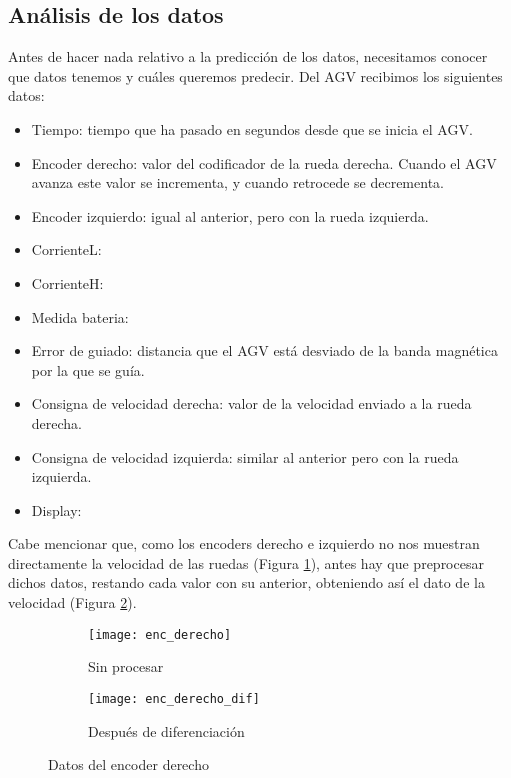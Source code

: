 \subsection{Análisis de los datos}

Antes de hacer nada relativo a la predicción de los datos, necesitamos conocer que datos tenemos y cuáles 
queremos predecir. Del AGV recibimos los siguientes datos:
\begin{itemize}
    \item Tiempo: tiempo que ha pasado en segundos desde que se inicia el AGV.
    \item Encoder derecho: valor del codificador de la rueda derecha. Cuando el AGV avanza este valor se
        incrementa, y cuando retrocede se decrementa.
    \item Encoder izquierdo: igual al anterior, pero con la rueda izquierda.
    \item CorrienteL: %
    \item CorrienteH: %
    \item Medida bateria: %
    \item Error de guiado: distancia que el AGV está desviado de la banda magnética por la que se guía.
    \item Consigna de velocidad derecha: valor de la velocidad enviado a la rueda derecha.
    \item Consigna de velocidad izquierda: similar al anterior pero con la rueda izquierda.
    \item Display: %
\end{itemize}

Cabe mencionar que, como los encoders derecho e izquierdo no nos muestran directamente la velocidad de las 
ruedas (Figura \ref{fig:datos_enc_derecho_sp}), antes hay que preprocesar dichos datos, restando cada valor con su anterior, obteniendo así el dato de la 
velocidad (Figura \ref{fig:datos_enc_derecho_dif}).

\begin{figure}[H]
    \centering
    \begin{subfigure}[b]{0.45\textwidth}
        \centering
        \texttt{[image: enc\_derecho]}
        \caption{Sin procesar}
        \label{fig:datos_enc_derecho_sp}
    \end{subfigure}
    \hfill
    \begin{subfigure}[b]{0.45\textwidth}
        \centering
        \texttt{[image: enc\_derecho\_dif]}
        \caption{Después de diferenciación}
        \label{fig:datos_enc_derecho_dif}
    \end{subfigure}
    \caption{Datos del encoder derecho}
    \label{fig:datos_enc_derecho}
\end{figure}

